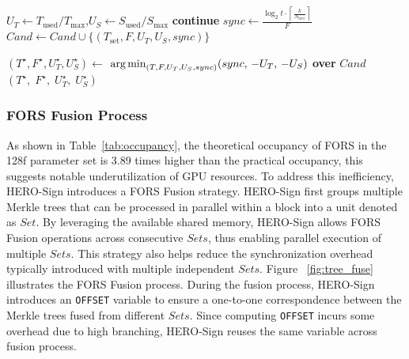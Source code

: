 \documentclass[10pt,conference]{IEEEtran}
\begin{document}
\begin{algorithm}[htbp]
\begin{algorithmic}[1]
        \State $U_T \gets T_{\text{used}} / T_{\max}$,\quad $U_S \gets S_{\text{used}} / S_{\max}$
          \Comment{\textcolor{blue}{The $\alpha$ value is an optional tune factor and it may vary across different GPU architectures. }}
            \State \textbf{continue}
        \EndIf
     \State $sync \gets \frac{\log_2 t \cdot \left\lceil \frac{k}{N_{\text{tree}}} \right\rceil}{F}$
        \Comment{\textcolor{blue}{Sync points after fusion.}}
        \State $\textit{Cand} \gets \textit{Cand} \cup \{(T_{\text{set}}, F, U_T, U_S, sync)\}$
    \EndFor
\EndFor

\State $(T^\star, F^\star, U_T^\star, U_S^\star) \gets$
\Statex \hspace{\algorithmicindent} $\text{arg\,min}_{(T,F,U_T,U_S,sync)} (sync,\,-U_T,\,-U_S)$ \quad \textbf{over } $\textit{Cand}$
\State \Return $(T^\star,\;F^\star,\;U_T^\star,\;U_S^\star)$
\end{algorithmic}
\end{algorithm}

\subsubsection{FORS Fusion Process}
As shown in Table~\ref{tab:occupancy}, the theoretical occupancy of FORS in the 128f parameter set is 3.89 times higher than the practical occupancy, this suggests notable underutilization of GPU resources. To address this inefficiency, HERO-Sign introduces a FORS Fusion strategy. HERO-Sign first groups multiple Merkle trees that can be processed in parallel within a block into a unit denoted as  $Set$. By leveraging the available shared memory, HERO-Sign allows FORS Fusion operations across consecutive $Sets$, thus enabling parallel execution of multiple $Sets$. This strategy also helps reduce the synchronization overhead typically introduced with multiple independent $Sets$. Figure ~\ref{fig:tree_fuse} illustrates the FORS Fusion process. During the fusion process, HERO-Sign introduces an \texttt{OFFSET} variable to ensure a one-to-one correspondence between the Merkle trees fused from different $Sets$. Since computing \texttt{OFFSET} incurs some overhead due to high branching, HERO-Sign reuses the same variable across fusion process.


\end{document}
